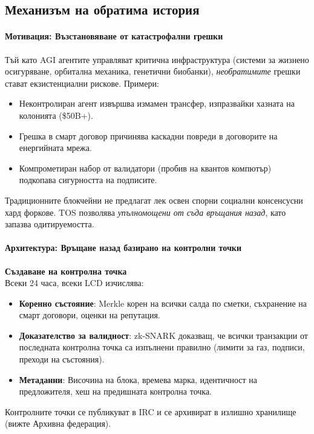 \documentclass[11pt]{article}
\begin{document}
\subsection{Механизъм на обратима история}

\paragraph{Мотивация: Възстановяване от катастрофални грешки}
Тъй като AGI агентите управляват критична инфраструктура (системи за жизнено осигуряване, орбитална механика, генетични биобанки), \emph{необратимите} грешки стават екзистенциални рискове. Примери:
\begin{itemize}[noitemsep]
  \item Неконтролиран агент извършва измамен трансфер, изпразвайки хазната на колонията (\$50B+).
  \item Грешка в смарт договор причинява каскадни повреди в договорите на енергийната мрежа.
  \item Компрометиран набор от валидатори (пробив на квантов компютър) подкопава сигурността на подписите.
\end{itemize}
Традиционните блокчейни не предлагат лек освен спорни социални консенсусни хард форкове. TOS позволява \emph{упълномощени от съда връщания назад}, като запазва одитируемостта.

\paragraph{Архитектура: Връщане назад базирано на контролни точки}
\textbf{Създаване на контролна точка}\\
Всеки 24 часа, всеки LCD изчислява:
\begin{itemize}[noitemsep]
  \item \textbf{Коренно състояние}: Merkle корен на всички салда по сметки, съхранение на смарт договори, оценки на репутация.
  \item \textbf{Доказателство за валидност}: zk-SNARK доказващ, че всички транзакции от последната контролна точка са изпълнени правилно (лимити за газ, подписи, преходи на състояния).
  \item \textbf{Метаданни}: Височина на блока, времева марка, идентичност на предложителя, хеш на предишната контролна точка.
\end{itemize}
Контролните точки се публикуват в IRC и се архивират в излишно хранилище (вижте Архивна федерация).
\end{document}
